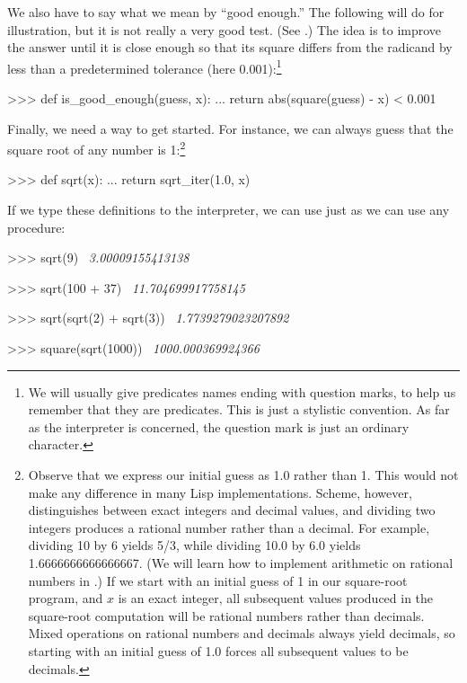 \noindent
We also have to say what we mean by ``good enough.''  The following will do for
illustration, but it is not really a very good test.  (See .)
The idea is to improve the answer until it is close
enough so that its square differs from the radicand by less than a
predetermined tolerance (here 0.001):\footnote{We will usually give predicates
names ending with question marks, to help us remember that they are predicates.
This is just a stylistic convention.  As far as the interpreter is concerned,
the question mark is just an ordinary character.}

\begin{codeBlock}
>>> def is_good_enough(guess, x):
...     return abs(square(guess) - x) < 0.001
\end{codeBlock}

\noindent
Finally, we need a way to get started.  For instance, we can always guess that
the square root of any number is 1:\footnote{Observe that we express our
initial guess as 1.0 rather than 1.  This would not make any difference in many
Lisp implementations.   Scheme, however, distinguishes between
exact integers and decimal values, and dividing two integers produces a
rational number rather than a decimal.  For example, dividing 10 by 6 yields
5/3, while dividing 10.0 by 6.0 yields 1.6666666666666667.  (We will learn how
to implement arithmetic on rational numbers in .)  If we
start with an initial guess of 1 in our square-root program, and \( x \) is an
exact integer, all subsequent values produced in the square-root computation
will be rational numbers rather than decimals.  Mixed operations on rational
numbers and decimals always yield decimals, so starting with an initial guess
of 1.0 forces all subsequent values to be decimals.}

\begin{codeBlock}
>>> def sqrt(x):
...     return sqrt_iter(1.0, x)
\end{codeBlock}

\noindent
If we type these definitions to the interpreter, we can use  just as
we can use any procedure:

\begin{codeBlock}
>>> sqrt(9)
~\textit{3.00009155413138}~

>>> sqrt(100 + 37)
~\textit{11.704699917758145}~

>>> sqrt(sqrt(2) + sqrt(3))
~\textit{1.7739279023207892}~

>>> square(sqrt(1000))
~\textit{1000.000369924366}~
\end{codeBlock}

